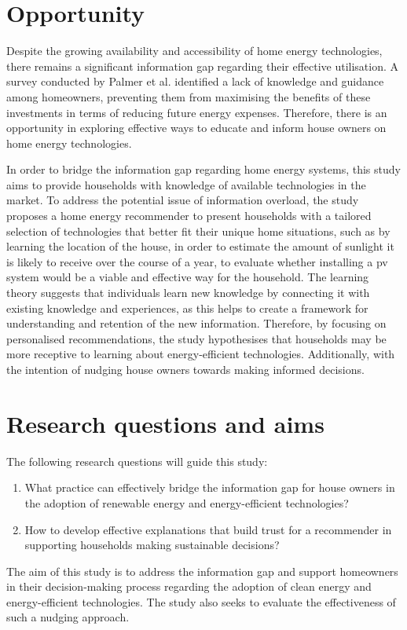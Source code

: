 \section{Opportunity}

Despite the growing availability and accessibility of home energy technologies, there remains a significant information gap regarding their effective utilisation. 
A survey conducted by Palmer et al. \cite{informationgap} identified a lack of knowledge and guidance among homeowners, preventing them from maximising the benefits of these investments in terms of reducing future energy expenses. 
Therefore, there is an opportunity in exploring effective ways to educate and inform house owners on home energy technologies. 

In order to bridge the information gap regarding home energy systems, this study aims to provide households with knowledge of available technologies in the market. 
To address the potential issue of information overload, the study proposes a home energy recommender to present households with a tailored selection of technologies that better fit their unique home situations, 
such as by learning the location of the house, in order to estimate the amount of sunlight it is likely to receive over the course of a year, to evaluate whether installing a \gls{pv} system would be a viable and effective way for the household.
The learning theory suggests that individuals learn new knowledge by connecting it with existing knowledge and experiences, as this helps to create a framework for understanding and retention of the new information.
Therefore, by focusing on personalised recommendations, the study hypothesises that households may be more receptive to learning about energy-efficient technologies. 
Additionally, with the intention of nudging house owners towards making informed decisions. 


\section{Research questions and aims}

The following research questions will guide this study: 
\begin{enumerate}
  \item What practice can effectively bridge the information gap for house owners in the adoption of renewable energy and energy-efficient technologies?
  \item How to develop effective explanations that build trust for a recommender in supporting households making sustainable decisions? 
\end{enumerate}
The aim of this study is to address the information gap and support homeowners in their decision-making process regarding the adoption of clean energy and energy-efficient technologies. 
The study also seeks to evaluate the effectiveness of such a nudging approach. 

